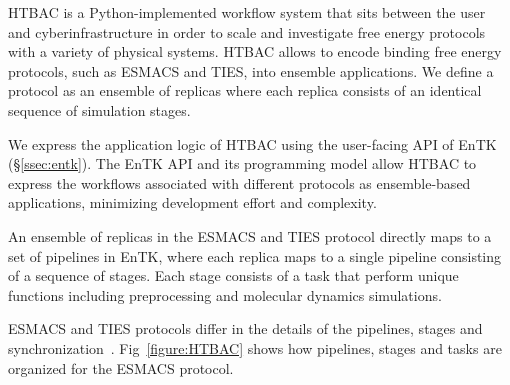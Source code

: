 HTBAC is a Python-implemented workflow system that sits between the 
user and cyberinfrastructure in order to scale and investigate free energy 
protocols with a variety of physical systems. HTBAC allows to
encode binding free energy protocols, such as ESMACS and TIES, into ensemble
applications\@. We define a protocol as an ensemble of replicas where each
replica consists of an identical sequence of simulation stages. 
 

We express the application logic of HTBAC using the user-facing API 
of EnTK (\S\ref{ssec:entk}). 
The EnTK %
API and its programming model 
allow HTBAC to express the workflows associated with different protocols as
ensemble-based applications, %
minimizing development effort and complexity. 

 

An ensemble of replicas in the ESMACS and TIES protocol directly maps to a set of
pipelines in EnTK, where each replica maps to a single pipeline consisting of
a sequence of stages. Each stage consists of a task
 that perform unique functions including preprocessing and
molecular dynamics simulations. 

ESMACS and TIES protocols differ in the details of the pipelines, stages and
synchronization~\cite{Bhati2017}. 
Fig~\ref{figure:HTBAC} %
shows how pipelines, stages and tasks are organized for the ESMACS
protocol.

